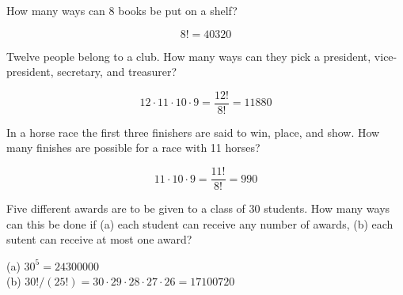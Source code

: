 \documentclass[11pt]{exam}
\begin{document}
\begin{questions}


\question How many ways can 8 books be put on a shelf?

\begin{solution}
\[
  8! = 40320
\]
\end{solution}



\newpage


\question Twelve people belong to a club.  How many ways can they pick a
president, vice-president, secretary, and treasurer?

\begin{solution}
\[
  12 \cdot 11 \cdot 10 \cdot 9 = \frac{12!}{8!} = 11880
\]
\end{solution}



\question In a horse race the first three finishers are said to win, place, and
show.  How many finishes are possible for a race with 11 horses?

\begin{solution}
\[
  11 \cdot 10 \cdot 9 = \frac{11!}{8!} = 990
\]
\end{solution}



\question Five different awards are to be given to a class of 30 students.  How
many ways can this be done if (a) each student can receive any number of
awards, (b) each sutent can receive at most one award?

\begin{solution}
(a) $30^5 = 24300000$ \\
(b) $30!/(25!) = 30 \cdot 29 \cdot 28 \cdot 27 \cdot 26 = 17100720$
\end{solution}






\end{questions}
\end{document}

